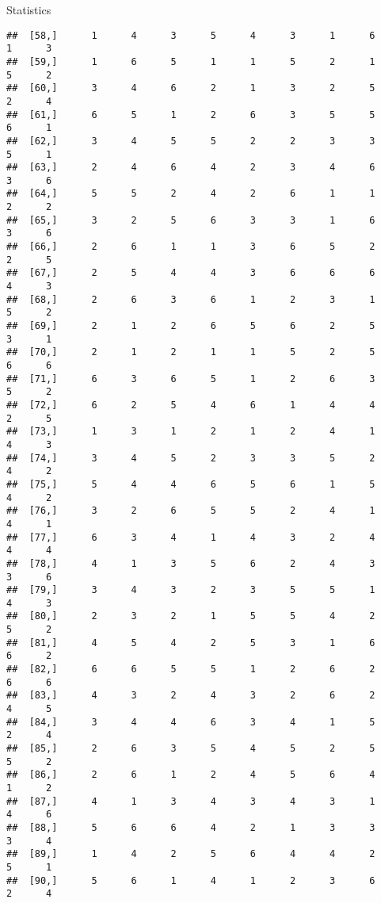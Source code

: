 \documentclass[
  ignorenonframetext,
]{beamer}
\begin{document}
\begin{frame}[fragile]{Statistics}
\begin{verbatim}
##  [58,]      1      4      3      5      4      3      1      6      1      3
##  [59,]      1      6      5      1      1      5      2      1      5      2
##  [60,]      3      4      6      2      1      3      2      5      2      4
##  [61,]      6      5      1      2      6      3      5      5      6      1
##  [62,]      3      4      5      5      2      2      3      3      5      1
##  [63,]      2      4      6      4      2      3      4      6      3      6
##  [64,]      5      5      2      4      2      6      1      1      2      2
##  [65,]      3      2      5      6      3      3      1      6      3      6
##  [66,]      2      6      1      1      3      6      5      2      2      5
##  [67,]      2      5      4      4      3      6      6      6      4      3
##  [68,]      2      6      3      6      1      2      3      1      5      2
##  [69,]      2      1      2      6      5      6      2      5      3      1
##  [70,]      2      1      2      1      1      5      2      5      6      6
##  [71,]      6      3      6      5      1      2      6      3      5      2
##  [72,]      6      2      5      4      6      1      4      4      2      5
##  [73,]      1      3      1      2      1      2      4      1      4      3
##  [74,]      3      4      5      2      3      3      5      2      4      2
##  [75,]      5      4      4      6      5      6      1      5      4      2
##  [76,]      3      2      6      5      5      2      4      1      4      1
##  [77,]      6      3      4      1      4      3      2      4      4      4
##  [78,]      4      1      3      5      6      2      4      3      3      6
##  [79,]      3      4      3      2      3      5      5      1      4      3
##  [80,]      2      3      2      1      5      5      4      2      5      2
##  [81,]      4      5      4      2      5      3      1      6      6      2
##  [82,]      6      6      5      5      1      2      6      2      6      6
##  [83,]      4      3      2      4      3      2      6      2      4      5
##  [84,]      3      4      4      6      3      4      1      5      2      4
##  [85,]      2      6      3      5      4      5      2      5      5      2
##  [86,]      2      6      1      2      4      5      6      4      1      2
##  [87,]      4      1      3      4      3      4      3      1      4      6
##  [88,]      5      6      6      4      2      1      3      3      3      4
##  [89,]      1      4      2      5      6      4      4      2      5      1
##  [90,]      5      6      1      4      1      2      3      6      2      4

\end{verbatim}
\end{frame}
\end{document}
